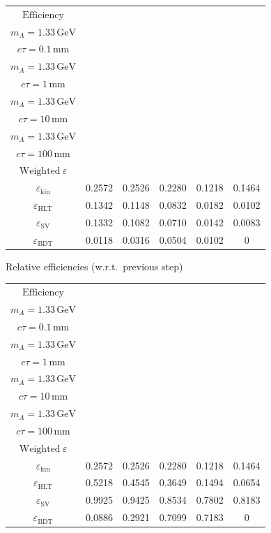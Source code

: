 \documentclass[10pt,a4paper]{article}
\begin{document}
{\begin{tabular}{cccccc}
\toprule
$\mathrm{Efficiency}$ & \shortstack{$m_{\pi}=4\,\mathrm{GeV}$\\$m_{A}=1.33\,\mathrm{GeV}$\\$c\tau=0.1\,\mathrm{mm}$} & \shortstack{$m_{\pi}=4\,\mathrm{GeV}$\\$m_{A}=1.33\,\mathrm{GeV}$\\$c\tau=1\,\mathrm{mm}$} & \shortstack{$m_{\pi}=4\,\mathrm{GeV}$\\$m_{A}=1.33\,\mathrm{GeV}$\\$c\tau=10\,\mathrm{mm}$} & \shortstack{$m_{\pi}=4\,\mathrm{GeV}$\\$m_{A}=1.33\,\mathrm{GeV}$\\$c\tau=100\,\mathrm{mm}$} & \shortstack{$\mathrm{QCD}$\\$\mathrm{Weighted}\ \varepsilon$} \\
\midrule
$\varepsilon_{\mathrm{kin}}$ & 0.2572 & 0.2526 & 0.2280 & 0.1218 & 0.1464\\
$\varepsilon_{\mathrm{HLT}}$ & 0.1342 & 0.1148 & 0.0832 & 0.0182 & 0.0102\\
$\varepsilon_{\mathrm{SV}}$ & 0.1332 & 0.1082 & 0.0710 & 0.0142 & 0.0083\\
$\varepsilon_{\mathrm{BDT}}$ & 0.0118 & 0.0316 & 0.0504 & 0.0102 & $0$\\
\bottomrule
\end{tabular}

\vspace{18pt}

Relative efficiencies (w.r.t.\ previous step)

\begin{tabular}{cccccc}
\toprule
$\mathrm{Efficiency}$ & \shortstack{$m_{\pi}=4\,\mathrm{GeV}$\\$m_{A}=1.33\,\mathrm{GeV}$\\$c\tau=0.1\,\mathrm{mm}$} & \shortstack{$m_{\pi}=4\,\mathrm{GeV}$\\$m_{A}=1.33\,\mathrm{GeV}$\\$c\tau=1\,\mathrm{mm}$} & \shortstack{$m_{\pi}=4\,\mathrm{GeV}$\\$m_{A}=1.33\,\mathrm{GeV}$\\$c\tau=10\,\mathrm{mm}$} & \shortstack{$m_{\pi}=4\,\mathrm{GeV}$\\$m_{A}=1.33\,\mathrm{GeV}$\\$c\tau=100\,\mathrm{mm}$} & \shortstack{$\mathrm{QCD}$\\$\mathrm{Weighted}\ \varepsilon$} \\
\midrule
$\varepsilon_{\mathrm{kin}}$ & 0.2572 & 0.2526 & 0.2280 & 0.1218 & 0.1464\\
$\varepsilon_{\mathrm{HLT}}$ & 0.5218 & 0.4545 & 0.3649 & 0.1494 & 0.0654\\
$\varepsilon_{\mathrm{SV}}$ & 0.9925 & 0.9425 & 0.8534 & 0.7802 & 0.8183\\
$\varepsilon_{\mathrm{BDT}}$ & 0.0886 & 0.2921 & 0.7099 & 0.7183 & $0$\\
\bottomrule
\end{tabular}

}
\end{document}
